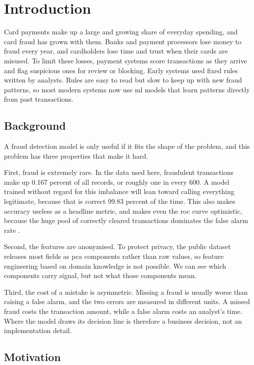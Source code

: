 \chapter{Introduction}
\label{ch:introduction}

Card payments make up a large and growing share of everyday spending, and card fraud has
grown with them. Banks and payment processors lose money to fraud every year, and
cardholders lose time and trust when their cards are misused. To limit these losses,
payment systems score transactions as they arrive and flag suspicious ones for review or
blocking. Early systems used fixed rules written by analysts. Rules are easy to read but
slow to keep up with new fraud patterns, so most modern systems now use \gls{ml} models
that learn patterns directly from past transactions.

\section{Background}

A fraud detection model is only useful if it fits the shape of the problem, and this
problem has three properties that make it hard.

First, fraud is extremely rare. In the data used here, fraudulent transactions
make up 0.167 percent of all records, or roughly one in every 600. A model trained without
regard for this imbalance will lean toward calling everything legitimate, because that is
correct 99.83 percent of the time. This also makes accuracy useless as a headline metric,
and makes even the \gls{roc} curve optimistic, because the huge pool of correctly cleared
transactions dominates the false alarm rate
\citep{davis2006relationship,saito2015precision}.

Second, the features are anonymised. To protect privacy, the public dataset
releases most fields as \gls{pca} components rather than raw values, so feature engineering
based on domain knowledge is not possible. We can see which components carry signal, but
not what those components mean.

Third, the cost of a mistake is asymmetric. Missing a fraud is usually worse than
raising a false alarm, and the two errors are measured in different units. A missed fraud
costs the transaction amount, while a false alarm costs an analyst's time. Where the model
draws its decision line is therefore a business decision, not an implementation detail.

\section{Motivation}

